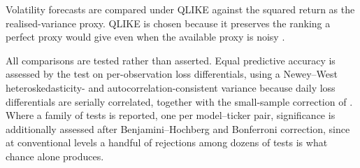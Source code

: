 Volatility forecasts are compared under QLIKE against the squared return as the
realised-variance proxy. QLIKE is chosen because it preserves the ranking a
perfect proxy would give even when the available proxy is noisy
\citep{patton2011volatility}.

All comparisons are tested rather than asserted. Equal predictive accuracy is
assessed by the \citet{diebold1995comparing} test on per-observation loss
differentials, using a Newey--West heteroskedasticity- and
autocorrelation-consistent variance because daily loss differentials are
serially correlated, together with the small-sample correction of
\citet{harvey1997testing}. Where a family of tests is reported, one per
model--ticker pair, significance is additionally assessed after
Benjamini--Hochberg and Bonferroni correction, since at conventional levels a
handful of rejections among dozens of tests is what chance alone produces.
